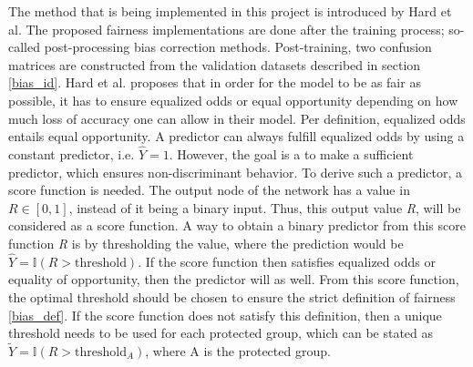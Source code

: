 \documentclass[11pt, fleqn, titlepage]{article}
\begin{document}
	The method that is being implemented in this project is introduced by Hard et al. \cite{equal_of_oppor} The proposed fairness implementations are done after the training process; so-called post-processing bias correction methods. Post-training, two confusion matrices are constructed from the validation datasets described in section \ref{bias_id}. Hard et al. proposes that in order for the model to be as fair as possible, it has to ensure equalized odds or equal opportunity depending on how much loss of accuracy one can allow in their model. Per definition, equalized odds entails equal opportunity. A predictor can always fulfill equalized odds by using a constant predictor, i.e. $ \hat Y = 1 $. However, the goal is a to make a sufficient predictor, which ensures non-discriminant behavior. To derive such a predictor, a score function is needed. The output node of the network has a value in $ R \in [0,1] $, instead of it being a binary input. Thus, this output value \textit{R}, will be considered as a score function. A way to obtain a binary predictor from this score function \textit{R} is by thresholding the value, where the prediction would be $ \hat Y = \mathbb I (R > \text{threshold}) $. If the score function then satisfies equalized odds or equality of opportunity, then the predictor will as well. From this score function, the optimal threshold should be chosen to ensure the strict definition of fairness \ref{bias_def}. If the score function does not satisfy this definition, then a unique threshold needs to be used for each protected group, which can be stated as $ \tilde Y = \mathbb I ( R > \text{threshold}_A)$, where A is the protected group. 
	
\end{document}
